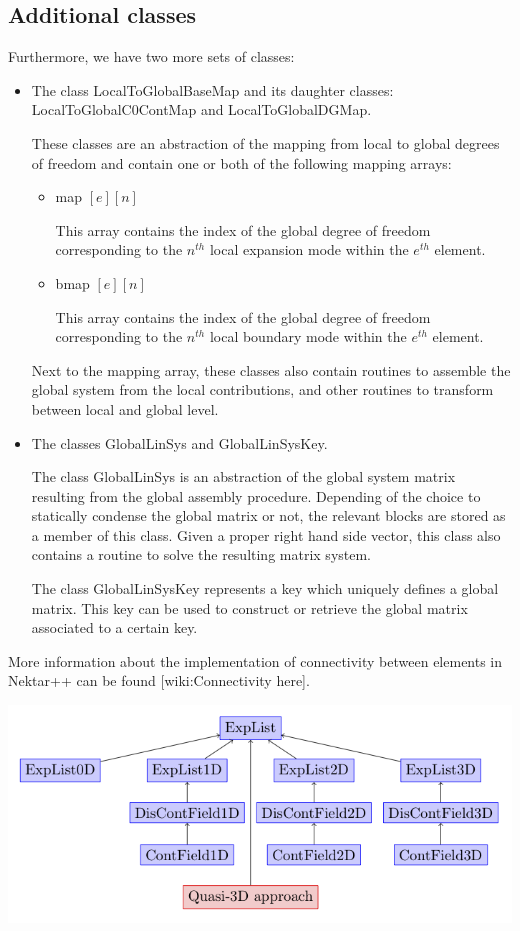 \subsection{Additional classes}
Furthermore, we have two more sets of classes:
\begin{itemize}
\item The class LocalToGlobalBaseMap and its daughter classes:
  LocalToGlobalC0ContMap and LocalToGlobalDGMap.
  
  These classes are an abstraction of the mapping from local to global degrees
  of freedom and contain one or both of the following mapping arrays:
  \begin{itemize}
  \item map $[e][n]$

    This array contains the index of the global degree of freedom corresponding
    to the $n^{th}$ local expansion mode within the $e^{th}$ element.
  \item bmap $[e][n]$
  
    This array contains the index of the global degree of freedom corresponding
    to the $n^{th}$ local boundary mode within the
    $e^{th}$ element.
  \end{itemize}
  Next to the mapping array, these classes also contain routines to assemble the
  global system from the local contributions, and other routines to transform
  between local and global level.
\item The classes GlobalLinSys and GlobalLinSysKey.

  The class GlobalLinSys is an abstraction of the global system matrix
  resulting from the global assembly procedure. Depending of the choice to
  statically condense the global matrix or not, the relevant blocks are stored
  as a member of this class. Given a proper right hand side vector, this class
  also contains a routine to solve the resulting matrix system.
  
  The class GlobalLinSysKey represents a key which uniquely defines a global
  matrix. This key can be used to construct or retrieve the global matrix 
  associated to a certain key.
\end{itemize}

More information about the implementation of connectivity between elements in
Nektar++ can be found [wiki:Connectivity here].

\begin{center}
\includegraphics{img/MultiRegions.png}
\end{center}

